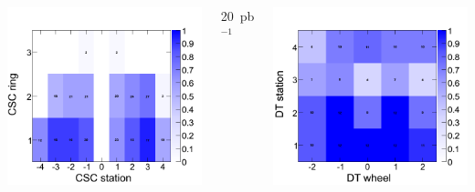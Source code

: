 \documentclass[compress]{beamer}
\begin{document}
\begin{frame}
\begin{columns}
\includegraphics[width=\linewidth]{il10_CSC_fraction.png}


\begin{center}
20~pb$^{-1}$
\end{center}

\vspace{-0.4 cm}
\includegraphics[width=\linewidth]{il20_DT_fraction.png}


\end{columns}
\end{frame}
\end{document}
